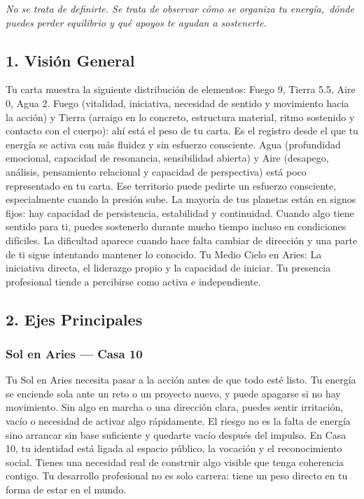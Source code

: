 \documentclass[11pt,a4paper]{article}\usepackage[utf8]{inputenc}
\begin{document}
\begin{center}
{\small\itshape
No se trata de definirte. Se trata de observar cómo se organiza tu energía,\
dónde puedes perder equilibrio y qué apoyos te ayudan a sostenerte.
}
\end{center}

\vspace{0.5cm}

\subsection{1. Visión General}

Tu carta muestra la siguiente distribución de elementos: Fuego 9, Tierra 5.5, Aire 0, Agua 2. Fuego (vitalidad, iniciativa, necesidad de sentido y movimiento hacia la acción) y Tierra (arraigo en lo concreto, estructura material, ritmo sostenido y contacto con el cuerpo): ahí está el peso de tu carta. Es el registro desde el que tu energía se activa con más fluidez y sin esfuerzo consciente. Agua (profundidad emocional, capacidad de resonancia, sensibilidad abierta) y Aire (desapego, análisis, pensamiento relacional y capacidad de perspectiva) está poco representado en tu carta. Ese territorio puede pedirte un esfuerzo consciente, especialmente cuando la presión sube. La mayoría de tus planetas están en signos fijos: hay capacidad de persistencia, estabilidad y continuidad. Cuando algo tiene sentido para ti, puedes sostenerlo durante mucho tiempo incluso en condiciones difíciles. La dificultad aparece cuando hace falta cambiar de dirección y una parte de ti sigue intentando mantener lo conocido. Tu Medio Cielo en Aries: La iniciativa directa, el liderazgo propio y la capacidad de iniciar. Tu presencia profesional tiende a percibirse como activa e independiente.

\vspace{0.8cm}

\subsection{2. Ejes Principales}

\subsubsection*{Sol en Aries — Casa 10}
Tu Sol en Aries necesita pasar a la acción antes de que todo esté listo. Tu energía se enciende sola ante un reto o un proyecto nuevo, y puede apagarse si no hay movimiento. Sin algo en marcha o una dirección clara, puedes sentir irritación, vacío o necesidad de activar algo rápidamente. El riesgo no es la falta de energía sino arrancar sin base suficiente y quedarte vacío después del impulso. En Casa 10, tu identidad está ligada al espacio público, la vocación y el reconocimiento social. Tienes una necesidad real de construir algo visible que tenga coherencia contigo. Tu desarrollo profesional no es solo carrera: tiene un peso directo en tu forma de estar en el mundo.
\end{document}
